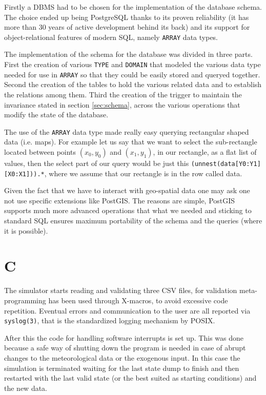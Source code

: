 \documentclass[Lau]{sapthesis} %
\let\oldsection\section
\def\subsection{\oldsection}
\def\section{\chapter}
\begin{document}
Firstly a DBMS had to be chosen for the implementation of the database schema.
The choice ended up being PostgreSQL thanks to its proven reliability (it has
more than 30 years of active development behind its back) and its support for
object-relational features of modern SQL, namely \texttt{ARRAY} data types.

The implementation of the schema for the database was divided in three parts.
First the creation of various \texttt{TYPE} and \texttt{DOMAIN} that modeled
the various data type needed for use in \texttt{ARRAY} so that they could be
easily stored and queryed together. Second the creation of the tables to hold the
various related data and to establish the relations among them. Third the
creation of the trigger to maintain the invariance stated in section
\ref{sec:schema}, across the various operations that modify the state of the
database.

The use of the \texttt{ARRAY} data type made really easy querying rectangular
shaped data (i.e. maps). For example let us say that we want to select the
sub-rectangle located between points $(x_0,y_0)$ and $(x_1,y_1)$, in our
rectangle, as a flat list of values, then the select part of our query would be
just this \texttt{(unnest(data[Y0:Y1][X0:X1])).*}, where we assume that our
rectangle is in the row called data.

Given the fact that we have to interact with geo-spatial data one may ask one
not use specific extensions like PostGIS. The reasons are simple, PostGIS
supports much more advanced operations that what we needed and sticking to
standard SQL ensures maximum portability of the schema and the queries (where
it is possible).

\subsection{C}

The simulator starts reading and validating three CSV files, for validation
meta-programming has been used through X-macros, to avoid excessive code
repetition. Eventual errors and communication to the user are all reported via
\texttt{syslog(3)}, that is the standardized logging mechanism by POSIX.

After this the code for handling software interrupts is set up. This was done
because a safe way of shutting down the program is needed in case of abrupt
changes to the meteorological data or the exogenous input. In this case the
simulation is terminated waiting for the last state dump to finish and then
restarted with the last valid state (or the best suited as starting conditions)
and the new data.
\end{document}
